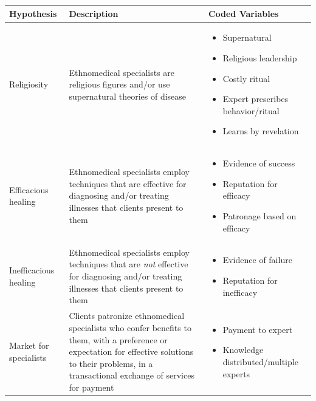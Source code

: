 \documentclass[
]{article}
\begin{document}
\begin{table}[!ht]
    \centering
    \begin{tabularx}{\textwidth}{@{}lXX@{}}
        \toprule
        \textbf{Hypothesis}   & \textbf{Description}      & \textbf{Coded Variables}\\
        \midrule
        Religiosity  & 
          Ethnomedical specialists are religious figures and/or use supernatural theories of disease & 
          \begin{itemize}
          \item Supernatural
          \item Religious leadership
          \item Costly ritual
          \item Expert prescribes behavior/ritual
          \item Learns by revelation
          \end{itemize}  \\
        \hline
      Efficacious healing    & 
        Ethnomedical specialists employ techniques that are effective for diagnosing and/or treating illnesses that clients present to them  & 
        \begin{itemize}
          \item Evidence of success
          \item Reputation for efficacy
          \item Patronage based on efficacy
          \end{itemize}  \\
        \hline
        Inefficacious healing    & 
        Ethnomedical specialists employ techniques that are \emph{not} effective for diagnosing and/or treating illnesses that clients present to them  & 
        \begin{itemize}
          \item Evidence of failure
          \item Reputation for inefficacy
          \end{itemize}  \\
        \hline
        Market for specialists    & 
        Clients patronize ethnomedical specialists who confer benefits to them, with a preference or expectation for effective solutions to their problems, in a transactional exchange of services for payment  & 
        \begin{itemize}
          \item Payment to expert
          \item Knowledge distributed/multiple experts

\end{itemize}
\end{tabularx}
\end{table}
\end{document}
